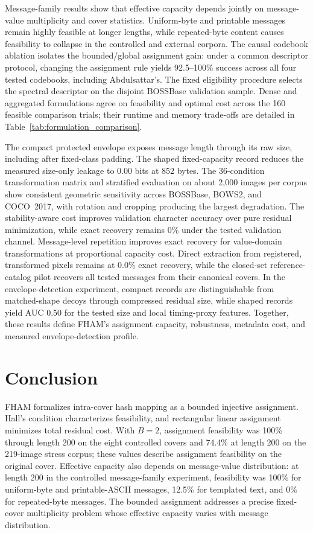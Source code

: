 \documentclass[preprint,12pt]{elsarticle}
\theoremstyle{plain}
\begin{document}
Message-family results show that effective capacity depends jointly on
message-value multiplicity and cover statistics. Uniform-byte and printable
messages remain highly feasible at longer lengths, while repeated-byte content
causes feasibility to collapse in the controlled and external corpora. The
causal codebook ablation isolates the bounded/global assignment gain: under a
common descriptor protocol, changing the assignment rule yields 92.5--100\%
success across all four tested codebooks, including Abdulsattar's. The fixed
eligibility procedure selects the spectral descriptor on the disjoint
BOSSBase validation sample. Dense and aggregated formulations agree on
feasibility and optimal cost across the 160 feasible comparison trials; their
runtime and memory trade-offs are detailed in Table~\ref{tab:formulation_comparison}.

The compact protected envelope exposes message length through its raw size,
including after fixed-class padding. The shaped fixed-capacity record reduces
the measured size-only leakage to 0.00 bits at 852 bytes. The 36-condition
transformation matrix and stratified evaluation on about 2,000 images per
corpus show consistent geometric sensitivity across BOSSBase, BOWS2, and
COCO~2017, with rotation and cropping producing the largest degradation. The
stability-aware cost improves validation character accuracy over pure residual
minimization, while exact recovery remains 0\% under the tested validation
channel. Message-level repetition improves exact recovery for value-domain
transformations at proportional capacity cost. Direct extraction from
registered, transformed pixels remains at 0.0\% exact recovery, while the
closed-set reference-catalog pilot recovers all tested messages from their
canonical covers. In the envelope-detection experiment, compact records are
distinguishable from matched-shape decoys through compressed residual size,
while shaped records yield AUC 0.50 for the tested size and local timing-proxy
features. Together, these results define FHAM's assignment capacity,
robustness, metadata cost, and measured envelope-detection profile.

\section{Conclusion}
\label{sec:conclusion}

FHAM formalizes intra-cover hash mapping as a bounded injective assignment.
Hall's condition characterizes feasibility, and rectangular linear assignment
minimizes total residual cost. With $B=2$, assignment feasibility was 100\%
through length 200 on the eight controlled covers and 74.4\% at length 200 on
the 219-image stress corpus; these values describe assignment feasibility on
the original cover. Effective capacity also depends on message-value
distribution: at length 200 in the controlled message-family experiment,
feasibility was 100\% for uniform-byte and printable-ASCII messages, 12.5\%
for templated text, and 0\% for repeated-byte messages. The bounded assignment
addresses a precise fixed-cover multiplicity problem whose effective capacity
varies with message distribution.
\end{document}
